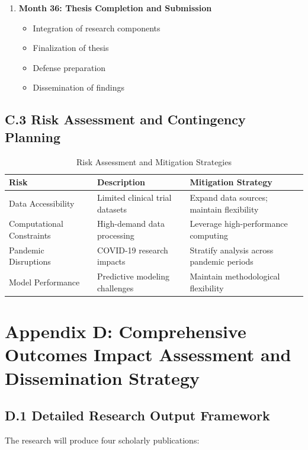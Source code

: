 \graphicspath{{./}{./sections/images/}{./images/}}\documentclass[12pt,a4paper,landscape]{article}
\begin{document}
\begin{enumerate}[leftmargin=*, itemsep=0.5em]
    \item \textbf{Month 36: Thesis Completion and Submission}
    \begin{itemize}[leftmargin=*]
        \item Integration of research components
        \item Finalization of thesis
        \item Defense preparation
        \item Dissemination of findings
    \end{itemize}
\end{enumerate}

\subsection*{C.3 Risk Assessment and Contingency Planning}
\begin{table}[H]
    \centering
    \caption{Risk Assessment and Mitigation Strategies}
    \label{tab:risks}
    \begin{tabular}{L{3cm}L{6cm}L{6cm}}
        \toprule
        \textbf{Risk} & \textbf{Description} & \textbf{Mitigation Strategy} \\
        \midrule
        Data Accessibility & Limited clinical trial datasets & Expand data sources; maintain flexibility \\
        \addlinespace
        Computational Constraints & High-demand data processing & Leverage high-performance computing \\
        \addlinespace
        Pandemic Disruptions & COVID-19 research impacts & Stratify analysis across pandemic periods \\
        \addlinespace
        Model Performance & Predictive modeling challenges & Maintain methodological flexibility \\
        \bottomrule
    \end{tabular}
\end{table}

\clearpage
\section*{Appendix D: Comprehensive Outcomes Impact Assessment and Dissemination Strategy}

\subsection*{D.1 Detailed Research Output Framework}
The research will produce four scholarly publications:
\end{document}

